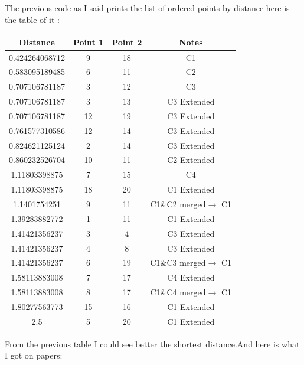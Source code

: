 \documentclass{article}
\begin{document}
The previous code as I said prints the list of ordered points by distance here is the table of it :\\
\begin{tabular}{|c|c|c|c|}
\hline
Distance&Point 1 & Point 2&Notes\\ \hline
0.424264068712&9&18&C1\\ \hline 
 0.583095189485&6&11&C2\\ \hline 
 0.707106781187&3&12&C3\\ \hline 
 0.707106781187&3&13&C3 Extended\\ \hline 
 0.707106781187&12&19&C3 Extended\\ \hline 
 0.761577310586&12&14&C3 Extended\\ \hline 
 0.824621125124&2&14&C3 Extended\\ \hline 
 0.860232526704&10&11&C2 Extended\\ \hline 
 1.11803398875&7&15&C4\\ \hline 
 1.11803398875&18&20&C1 Extended\\ \hline 
 1.1401754251&9&11&C1\&C2 merged\(\rightarrow\) C1\\ \hline 
 1.39283882772&1&11&C1 Extended\\ \hline 
 1.41421356237&3&4&C3 Extended\\ \hline 
 1.41421356237&4&8&C3 Extended\\ \hline 
 1.41421356237&6&19&C1\&C3 merged\(\rightarrow\) C1\\ \hline  
 1.58113883008&7&17&C4 Extended\\ \hline 
 1.58113883008&8&17&C1\&C4 merged\(\rightarrow\) C1\\ \hline 
 1.80277563773&15&16&C1 Extended\\ \hline 
 2.5&5&20&C1 Extended\\ \hline 
\end{tabular}
From the previous table I could see better the shortest distance.And here is what I got on papers:
\end{document}
